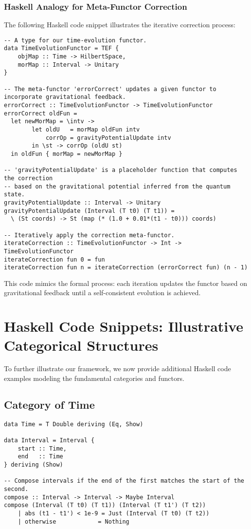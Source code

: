 \documentclass[12pt]{article}
\begin{document}
\subsubsection*{Haskell Analogy for Meta-Functor Correction}
The following Haskell code snippet illustrates the iterative correction process:

\begin{lstlisting}[caption={Iterative Correction Using a Meta-Functor in Haskell}]
-- A type for our time-evolution functor.
data TimeEvolutionFunctor = TEF {
    objMap :: Time -> HilbertSpace,
    morMap :: Interval -> Unitary
}

-- The meta-functor 'errorCorrect' updates a given functor to incorporate gravitational feedback.
errorCorrect :: TimeEvolutionFunctor -> TimeEvolutionFunctor
errorCorrect oldFun =
  let newMorMap = \intv ->
        let oldU   = morMap oldFun intv
            corrOp = gravityPotentialUpdate intv
        in \st -> corrOp (oldU st)
  in oldFun { morMap = newMorMap }

-- 'gravityPotentialUpdate' is a placeholder function that computes the correction
-- based on the gravitational potential inferred from the quantum state.
gravityPotentialUpdate :: Interval -> Unitary
gravityPotentialUpdate (Interval (T t0) (T t1)) =
  \ (St coords) -> St (map (* (1.0 + 0.01*(t1 - t0))) coords)

-- Iteratively apply the correction meta-functor.
iterateCorrection :: TimeEvolutionFunctor -> Int -> TimeEvolutionFunctor
iterateCorrection fun 0 = fun
iterateCorrection fun n = iterateCorrection (errorCorrect fun) (n - 1)
\end{lstlisting}

This code mimics the formal process: each iteration updates the functor based on gravitational feedback until a self-consistent evolution is achieved.

\section{Haskell Code Snippets: Illustrative Categorical Structures}
\label{sec:HaskellCode}
To further illustrate our framework, we now provide additional Haskell code examples modeling the fundamental categories and functors.

\subsection{Category of Time}
\begin{lstlisting}[caption={Category of Time in Haskell (simplified)}]
data Time = T Double deriving (Eq, Show)

data Interval = Interval {
    start :: Time,
    end   :: Time
} deriving (Show)

-- Compose intervals if the end of the first matches the start of the second.
compose :: Interval -> Interval -> Maybe Interval
compose (Interval (T t0) (T t1)) (Interval (T t1') (T t2))
    | abs (t1 - t1') < 1e-9 = Just (Interval (T t0) (T t2))
    | otherwise            = Nothing
\end{lstlisting}
\end{document}
